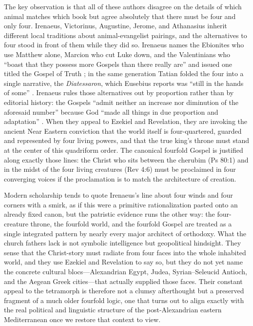 The key observation is that all of these authors disagree on the details of which animal matches which book but agree absolutely that there must be four and only four.
Irenaeus, Victorinus, Augustine, Jerome, and Athanasius inherit different local traditions about animal-evangelist pairings, and the alternatives to four stood in front of them while they did so.
Irenaeus names the Ebionites who use Matthew alone, Marcion who cut Luke down, and the Valentinians who ``boast that they possess more Gospels than there really are'' and issued one titled the Gospel of Truth \cite[3.11.7--9]{irenaeus:advhaer}; in the same generation Tatian folded the four into a single narrative, the \emph{Diatessaron}, which Eusebius reports was ``still in the hands of some'' \cite[4.29.6]{eusebius:he}.
Irenaeus rules those alternatives out by proportion rather than by editorial history: the Gospels ``admit neither an increase nor diminution of the aforesaid number'' because God ``made all things in due proportion and adaptation'' \cite[3.11.9]{irenaeus:advhaer}.
When they appeal to Ezekiel and Revelation, they are invoking the ancient Near Eastern conviction that the world itself is four-quartered, guarded and represented by four living powers, and that the true king's throne must stand at the center of this quadriform order.
The canonical fourfold Gospel is justified along exactly those lines: the Christ who sits between the cherubim (Ps 80:1) and in the midst of the four living creatures (Rev 4:6) must be proclaimed in four converging voices if the proclamation is to match the architecture of creation.

Modern scholarship tends to quote Irenaeus's line about four winds and four corners with a smirk, as if this were a primitive rationalization pasted onto an already fixed canon, but the patristic evidence runs the other way: the four-creature throne, the fourfold world, and the fourfold Gospel are treated as a single integrated pattern by nearly every major architect of orthodoxy.
What the church fathers lack is not symbolic intelligence but geopolitical hindsight.
They sense that the Christ-story must radiate from four faces into the whole inhabited world, and they use Ezekiel and Revelation to say so, but they do not yet name the concrete cultural blocs---Alexandrian Egypt, Judea, Syrian--Seleucid Antioch, and the Aegean Greek cities---that actually supplied those faces.
Their constant appeal to the tetramorph is therefore not a clumsy afterthought but a preserved fragment of a much older fourfold logic, one that turns out to align exactly with the real political and linguistic structure of the post-Alexandrian eastern Mediterranean once we restore that context to view.

